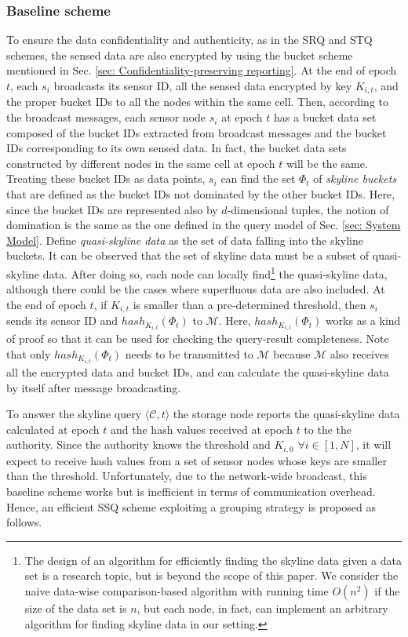\documentclass[conference]{IEEEtran}
\begin{document}
\subsubsection{Baseline scheme}\label{sec: Baseline scheme}
To ensure the data confidentiality and authenticity, as in the SRQ and STQ schemes, the sensed data are also encrypted by using the bucket scheme mentioned in Sec. \ref{sec: Confidentiality-preserving reporting}. At the end of epoch $t$, each $s_i$ broadcasts its sensor ID, all the sensed data encrypted by key $K_{i,t}$, and the proper bucket IDs to all the nodes within the same cell. Then, according to the broadcast messages, each sensor node $s_i$ at epoch $t$ has a bucket data set composed of the bucket IDs extracted from broadcast messages and the bucket IDs corresponding to its own sensed data. In fact, the bucket data sets constructed by different nodes in the same cell at epoch $t$ will be the same. Treating these bucket IDs as data points, $s_i$ can find the set $\Phi_t$ of \emph{skyline buckets} that are defined as the bucket IDs not dominated by the other bucket IDs. Here, since the bucket IDs are represented also by $d$-dimensional tuples, the notion of domination is the same as the one defined in the query model of Sec. \ref{sec: System Model}. Define \emph{quasi-skyline data} as the set of data falling into the skyline buckets. It can be observed that the set of skyline data must be a subset of quasi-skyline data. After doing so, each node can locally find\footnote{The design of an algorithm for efficiently finding the skyline data given a data set is a research topic, but is beyond the scope of this paper. We consider the naive data-wise comparison-based algorithm with running time $O(n^2)$ if the size of the data set is $n$, but each node, in fact, can implement an arbitrary algorithm for finding skyline data in our setting.} the quasi-skyline data, although there could be the cases where superfluous data are also included. At the end of epoch $t$, if $K_{i,t}$ is smaller than a pre-determined threshold, then $s_i$ sends its sensor ID and $hash_{K_{i,t}}(\Phi_t)$ to $\mathcal{M}$. Here, $hash_{K_{i,t}}(\Phi_t)$ works as a kind of proof so that it can be used for checking the query-result completeness. Note that only $hash_{K_{i,t}}(\Phi_t)$ needs to be transmitted to $\mathcal{M}$ because $\mathcal{M}$ also receives all the encrypted data and bucket IDs, and can calculate the quasi-skyline data by itself after message broadcasting.

To answer the skyline query $\langle \mathcal{C}, t\rangle$ the storage node reports the quasi-skyline data calculated at epoch $t$ and the hash values received at epoch $t$ to the the authority. Since the authority knows the threshold and $K_{i,0}$ $\forall i\in[1,N]$, it will expect to receive hash values from a set of sensor nodes whose keys are smaller than the threshold. Unfortunately, due to the network-wide broadcast, this baseline scheme works but is inefficient in terms of communication overhead. Hence, an efficient SSQ scheme exploiting a grouping strategy is proposed as follows.
\end{document}
